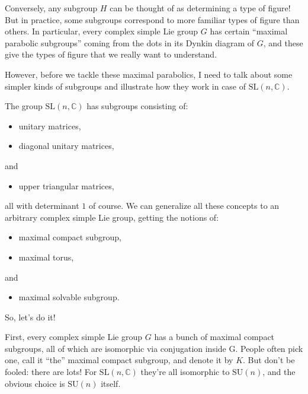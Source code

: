 \documentclass{article}
\def\tightlist{}
\begin{document}
Conversely, any subgroup \(H\) can be thought of as determining a type
of figure! But in practice, some subgroups correspond to more familiar
types of figure than others. In particular, every complex simple Lie
group \(G\) has certain ``maximal parabolic subgroups'' coming from the
dots in its Dynkin diagram of \(G\), and these give the types of figure
that we really want to understand.

However, before we tackle these maximal parabolics, I need to talk about
some simpler kinds of subgroups and illustrate how they work in case of
\(\mathrm{SL}(n,\mathbb{C})\).

The group \(\mathrm{SL}(n,\mathbb{C})\) has subgroups consisting of:

\begin{itemize}
\tightlist
\item
  unitary matrices,
\item
  diagonal unitary matrices,
\end{itemize}

and

\begin{itemize}
\tightlist
\item
  upper triangular matrices,
\end{itemize}

all with determinant \(1\) of course. We can generalize all these
concepts to an arbitrary complex simple Lie group, getting the notions
of:

\begin{itemize}
\tightlist
\item
  maximal compact subgroup,
\item
  maximal torus,
\end{itemize}

and

\begin{itemize}
\tightlist
\item
  maximal solvable subgroup.
\end{itemize}

So, let's do it!

First, every complex simple Lie group \(G\) has a bunch of maximal
compact subgroups, all of which are isomorphic via conjugation inside G.
People often pick one, call it ``the'' maximal compact subgroup, and
denote it by \(K\). But don't be fooled: there are lots! For
\(\mathrm{SL}(n,\mathbb{C})\) they're all isomorphic to
\(\mathrm{SU}(n)\), and the obvious choice is \(\mathrm{SU}(n)\) itself.
\end{document}
